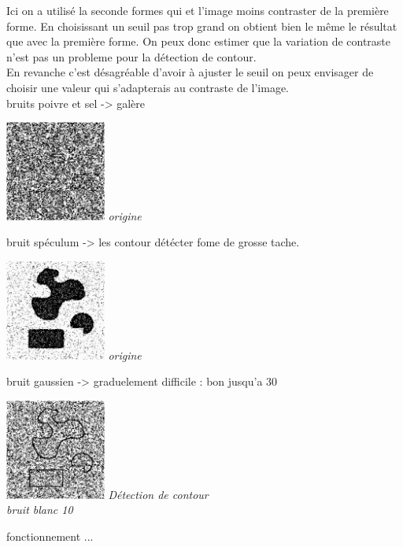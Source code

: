 \documentclass[a4,12pt]{article}
\begin{document}
Ici on a utilisé la seconde formes qui et l'image moins contraster de la première forme. En choisissant un seuil pas trop grand on obtient bien le même le résultat 
que avec la première forme.
On peux donc estimer que la variation de contraste n'est pas un probleme pour la détection de contour.\\
En revanche c'est désagréable d'avoir à ajuster le seuil on peux envisager de choisir une valeur qui s'adapterais au contraste de l'image.\\

bruits poivre et sel -> galère
\noindent
\begin{center}
\begin{minipage}[c]{0.20\linewidth}
	\begin{center}
		\includegraphics[width = 33mm]{./img/p2test_grad_mean_formes2pets5.jpg}
		\textit{origine}
	\end{center}
\end{minipage}
\end{center}

bruit spéculum -> les contour détécter fome de grosse tache.
\noindent
\begin{center}
\begin{minipage}[c]{0.20\linewidth}
	\begin{center}
		\includegraphics[width = 33mm]{./img/p2test_grad_mean_formes1sp.jpg}
		\textit{origine}
	\end{center}
\end{minipage}
\end{center}

bruit gaussien -> graduelement difficile : bon jusqu'a 30
\noindent
\begin{center}
\begin{minipage}[c]{0.20\linewidth}
	\begin{center}
		\includegraphics[width = 33mm]{./img/p2test_grad_mean_formes2bb10.jpg}
		\textit{Détection de contour \\bruit blanc 10}
	\end{center}
\end{minipage}
\end{center}
fonctionnement ...
\end{document}
